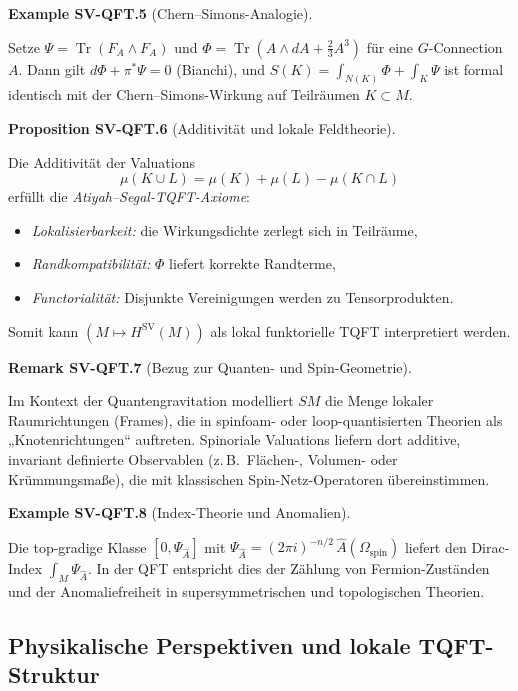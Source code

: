 \documentclass[10pt, letterpaper]{article}
\newcommand{\CustomHeading}[3]{%
  \par\medskip\noindent%
  \textbf{#1 #2} \textnormal{(#3)}.\enskip%
}
\newenvironment{PROP}[2]{\begin{unitbox}\CustomHeading{Proposition}{#1}{#2}}{\end{unitbox}}
\newenvironment{REM}[2]{\begin{unitbox}\CustomHeading{Remark}{#1}{#2}}{\end{unitbox}}
\newenvironment{EXA}[2]{\begin{unitbox}\CustomHeading{Example}{#1}{#2}}{\end{unitbox}}
\begin{document}
\begin{EXA}{SV-QFT.5}{Chern--Simons-Analogie}
Setze $\Psi=\operatorname{Tr}(F_A\wedge F_A)$ und $\Phi=\operatorname{Tr}(A\wedge dA+\tfrac23A^3)$
für eine $G$-Connection $A$.
Dann gilt $d\Phi+\pi^*\Psi=0$ (Bianchi), und $S(K)=\int_{N(K)}\Phi+\int_K\Psi$
ist formal identisch mit der Chern--Simons-Wirkung auf Teilräumen $K\subset M$.
\end{EXA}

\begin{PROP}{SV-QFT.6}{Additivität und lokale Feldtheorie}
Die Additivität der Valuations
\[
\mu(K\cup L)=\mu(K)+\mu(L)-\mu(K\cap L)
\]
erfüllt die \emph{Atiyah–Segal-TQFT-Axiome}:
\begin{itemize}
\item \emph{Lokalisierbarkeit:} die Wirkungsdichte zerlegt sich in Teilräume,
\item \emph{Randkompatibilität:} $\Phi$ liefert korrekte Randterme,
\item \emph{Functorialität:} Disjunkte Vereinigungen werden zu Tensorprodukten.
\end{itemize}
Somit kann $(M\mapsto H^{\operatorname{SV}}(M))$ als lokal funktorielle TQFT interpretiert werden.
\end{PROP}

\begin{REM}{SV-QFT.7}{Bezug zur Quanten- und Spin-Geometrie}
Im Kontext der Quantengravitation modelliert $SM$ die Menge lokaler Raumrichtungen (Frames),
die in spinfoam- oder loop-quantisierten Theorien als „Knotenrichtungen“ auftreten.
Spinoriale Valuations liefern dort additive, invariant definierte Observablen
(z.\,B.\ Flächen-, Volumen- oder Krümmungsmaße),
die mit klassischen Spin-Netz-Operatoren übereinstimmen.
\end{REM}

\begin{EXA}{SV-QFT.8}{Index-Theorie und Anomalien}
Die top-gradige Klasse $[0,\Psi_{\widehat A}]$ mit $\Psi_{\widehat A}=(2\pi i)^{-n/2}\,\widehat A(\Omega_{\mathrm{spin}})$
liefert den Dirac-Index $\int_M\Psi_{\widehat A}$.
In der QFT entspricht dies der Zählung von Fermion-Zuständen und der Anomaliefreiheit
in supersymmetrischen und topologischen Theorien.
\end{EXA}

\pagebreak

\subsection{Physikalische Perspektiven und lokale TQFT-Struktur}
\end{document}
